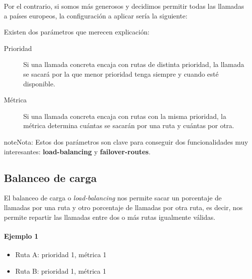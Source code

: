 \documentclass[letterpaper,10pt,spanish]{sphinxmanual}
\begin{document}
Por el contrario, si somos más generosos y decidimos permitir todas las llamadas a países europeos, la configuración a aplicar sería la siguiente:

\label{external_outgoing_calls/call_routing:routes-metrics}
Existen dos parámetros que merecen explicación:
\begin{description}
\item[{Prioridad}] \leavevmode{}\label{external_outgoing_calls/call_routing:term-prioridad}
Si una llamada concreta encaja con rutas de distinta prioridad, la llamada se sacará por la que menor prioridad tenga siempre y cuando esté disponible.

\item[{Métrica}] \leavevmode{}\label{external_outgoing_calls/call_routing:term-metrica}
Si una llamada concreta encaja con rutas con la misma prioridad, la métrica determina cuántas se sacarán por una ruta y cuántas por otra.

\end{description}

\begin{notice}{note}{Nota:}
Estos dos parámetros son clave para conseguir dos funcionalidades muy interesantes: \textbf{load-balancing} y \textbf{failover-routes}.
\end{notice}


\subsection{Balanceo de carga}
\label{external_outgoing_calls/call_routing:balanceo-de-carga}
El balanceo de carga o \emph{load-balancing} nos permite sacar un porcentaje de llamadas por una ruta y otro porcentaje de llamadas por otra ruta, es decir, nos permite repartir las llamadas entre dos o más rutas igualmente válidas.
\paragraph{Ejemplo 1}
\begin{itemize}
\item {} 
Ruta A: prioridad 1, métrica 1

\item {} 
Ruta B: prioridad 1, métrica 1

\end{itemize}
\end{document}
